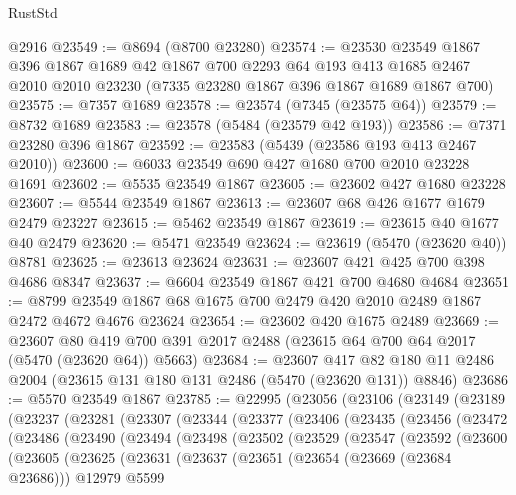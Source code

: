\begin{lexlean}{RustStd}
\begin{coremodule}
{\begin{coremodule}
{{{{{{{{{{{{{{{{{{{{{{{{{{{{{{{    @2916
@23549 := @8694 (@8700 @23280)
@23574 := @23530
    @23549
    @1867
    @396
    @1867
    @1689
    @42
    @1867
    @700
    @2293
    @64
    @193
    @413
    @1685
    @2467
    @2010
    @2010
    @23230
    (@7335 @23280 @1867 @396 @1867 @1689 @1867 @700)
@23575 := @7357 @1689
@23578 := @23574 (@7345 (@23575 @64))
@23579 := @8732 @1689
@23583 := @23578 (@5484 (@23579 @42 @193))
@23586 := @7371 @23280 @396 @1867
@23592 := @23583 (@5439 (@23586 @193 @413 @2467 @2010))
@23600 := @6033 @23549 @690 @427 @1680 @700 @2010 @23228 @1691
@23602 := @5535 @23549 @1867
@23605 := @23602 @427 @1680 @23228
@23607 := @5544 @23549 @1867
@23613 := @23607 @68 @426 @1677 @1679 @2479 @23227
@23615 := @5462 @23549 @1867
@23619 := @23615 @40 @1677 @40 @2479
@23620 := @5471 @23549
@23624 := @23619 (@5470 (@23620 @40)) @8781
@23625 := @23613 @23624
@23631 := @23607 @421 @425 @700 @398 @4686 @8347
@23637 := @6604 @23549 @1867 @421 @700 @4680 @4684
@23651 := @8799 @23549 @1867 @68 @1675 @700 @2479 @420 @2010 @2489 @1867 @2472 @4672 @4676 @23624
@23654 := @23602 @420 @1675 @2489
@23669 := @23607
    @80
    @419
    @700
    @391
    @2017
    @2488
    (@23615 @64 @700 @64 @2017 (@5470 (@23620 @64)) @5663)
@23684 := @23607
    @417
    @82
    @180
    @11
    @2486
    @2004
    (@23615 @131 @180 @131 @2486 (@5470 (@23620 @131)) @8846)
@23686 := @5570 @23549 @1867
@23785 := @22995
    (@23056
      (@23106
        (@23149
          (@23189
            (@23237
              (@23281
                (@23307
                  (@23344
                    (@23377
                      (@23406
                        (@23435
                          (@23456
                            (@23472
                              (@23486
                                (@23490
                                  (@23494
                                    (@23498
                                      (@23502
                                        (@23529
                                          (@23547
                                            (@23592
                                              (@23600
                                                (@23605
                                                  (@23625
                                                    (@23631
                                                      (@23637
                                                        (@23651
                                                          (@23654 (@23669 (@23684 @23686)))
                                                          @12979
                                                          @5599
}}}}}}}}}}}}}}}}}}}}}}}}}}}}}}}
\end{coremodule}}
\end{coremodule}
\end{lexlean}
